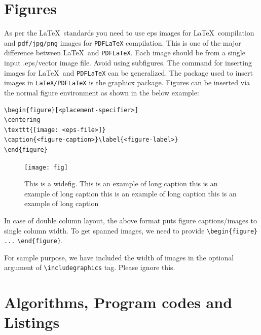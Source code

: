 \documentclass{article}
\begin{document}
\section{Figures}\label{sec6}

As per the \LaTeX\ standards you need to use eps images for \LaTeX\ compilation and \verb+pdf/jpg/png+ images for \verb+PDFLaTeX+ compilation. This is one of the major difference between \LaTeX\ and \verb+PDFLaTeX+. Each image should be from a single input .eps/vector image file. Avoid using subfigures. The command for inserting images for \LaTeX\ and \verb+PDFLaTeX+ can be generalized. The package used to insert images in \verb+LaTeX/PDFLaTeX+ is the graphicx package. Figures can be inserted via the normal figure environment as shown in the below example:

\bigskip
\begin{verbatim}
\begin{figure}[<placement-specifier>]
\centering
\texttt{[image: <eps-file>]}
\caption{<figure-caption>}\label{<figure-label>}
\end{figure}
\end{verbatim}
\bigskip

\begin{figure}[h]%
\centering
\texttt{[image: fig]}
\caption{This is a widefig. This is an example of long caption this is an example of long caption  this is an example of long caption this is an example of long caption}\label{fig1}
\end{figure}

In case of double column layout, the above format puts figure captions/images to single column width. To get spanned images, we need to provide \verb+\begin{figure}+ \verb+...+ \verb+\end{figure}+.

For sample purpose, we have included the width of images in the optional argument of \verb+\includegraphics+ tag. Please ignore this. 

\section{Algorithms, Program codes and Listings}\label{sec7}
\end{document}
